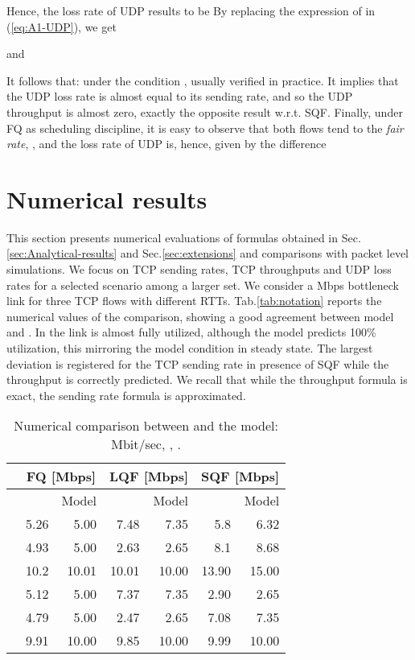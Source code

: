 \documentclass[a4paper,oneside, 11pt]{article}
\begin{document}
Hence, the loss rate of UDP results to be By replacing the expression of  in (\ref{eq:A1-UDP}), we get

and 

It follows that:
under the condition , usually verified in practice.
It implies that the UDP loss rate is almost equal to its sending rate, and so the UDP throughput
is almost zero, exactly the opposite result w.r.t. SQF.
Finally, under FQ as scheduling discipline, it is easy to observe that both flows tend to the \textit{fair rate},
, 
and the loss rate of UDP is, hence, given by the difference

\section{Numerical results}\label{sec:numerics}
This section presents numerical evaluations of formulas obtained
in Sec.\ref{sec:Analytical-results} and Sec.\ref{sec:extensions}
and comparisons with packet level simulations.
We focus on TCP sending rates, TCP throughputs and UDP loss rates
for a selected scenario among a larger set.
We consider a Mbps bottleneck link for three TCP flows with different
RTTs. Tab.\ref{tab:notation} reports the numerical values of the
comparison, showing a good agreement between model and .
In  the link is almost fully utilized, although the model predicts
100\% utilization, this mirroring the model condition  in steady state.
The largest deviation
is registered for the TCP sending rate in presence of SQF while
the throughput is correctly predicted. We recall that while the throughput
formula is exact, the sending rate formula is approximated.
\begin{table}
\centering
\begin{tabular}{|l|rr|rr|rr|}
\hline
& \multicolumn{2}{|c}{{FQ [Mbps]}} & \multicolumn{2}{|c}{{LQF [Mbps]}} &\multicolumn{2}{|c|}{{SQF [Mbps]}} \\
\hline
\hline
&  & Model&  & Model&  & Model\\
  & 5.26 & 5.00 & 7.48 & 7.35 & 5.8 & 6.32 \\
  & 4.93 & 5.00 & 2.63 & 2.65 & 8.1 & 8.68 \\
    & 10.2 & 10.01 & 10.01 & 10.00 & 13.90 &  15.00\\
 & 5.12 & 5.00 & 7.37 & 7.35 & 2.90 & 2.65 \\
 & 4.79 & 5.00 & 2.47 & 2.65 & 7.08 & 7.35 \\
 & 9.91 & 10.00  & 9.85 & 10.00 & 9.99 & 10.00 \\
\hline
\end{tabular}
\caption{Numerical comparison between  and the model: Mbit/sec, , .}
\label{tab:numerics}
\end{table}
\end{document}
